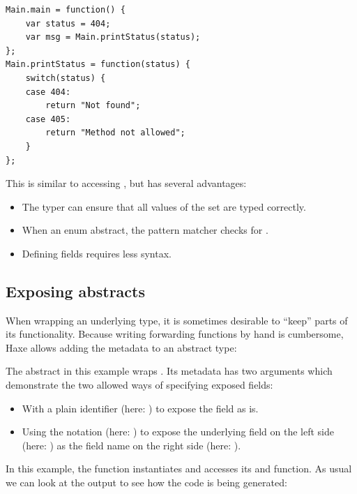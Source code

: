\documentclass{haxe}
\begin{document}
\begin{lstlisting}
Main.main = function() {
	var status = 404;
	var msg = Main.printStatus(status);
};
Main.printStatus = function(status) {
	switch(status) {
	case 404:
		return "Not found";
	case 405:
		return "Method not allowed";
	}
};
\end{lstlisting}

This is similar to accessing , but has several advantages:

\begin{itemize}
	\item The typer can ensure that all values of the set are typed correctly.
	\item When  an enum abstract, the pattern matcher checks for .
	\item Defining fields requires less syntax.
\end{itemize}

\subsection{Exposing abstracts}
\label{types-abstract-expose}

When wrapping an underlying type, it is sometimes desirable to ``keep'' parts of its functionality. Because writing forwarding functions by hand is cumbersome, Haxe allows adding the  metadata to an abstract type:


The  abstract in this example wraps . Its  metadata has two arguments which demonstrate the two allowed ways of specifying exposed fields:

\begin{itemize}
	\item With a plain identifier (here: ) to expose the field as is.
	\item Using the \expr{=>} notation (here: ) to expose the underlying field on the left side (here: ) as the field name on the right side (here: ).
\end{itemize}

In this example, the  function instantiates  and accesses its  and  function. As usual we can look at the  output to see how the code is being generated:
\end{document}
